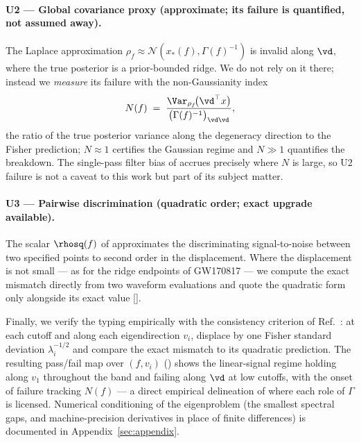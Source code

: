 \paragraph{U2 --- Global covariance proxy (approximate; its failure is
quantified, not assumed away).}
The Laplace approximation
$\rho_f \approx \mathcal{N}(x_{*}(f), \Gamma(f)^{-1})$ is invalid along
$\vd$, where the true posterior is a prior-bounded ridge. We do not
rely on it there; instead we \emph{measure} its failure with the
non-Gaussianity index
\begin{equation}
N(f) \;=\;
\frac{\Var_{\rho_f}\!\bigl(\vd^{\top} x\bigr)}
{\bigl(\Gamma(f)^{-1}\bigr)_{\vd\vd}} ,
\label{eq:ngauss}
\end{equation}
the ratio of the true posterior variance along the degeneracy direction
to the Fisher prediction; $N \approx 1$ certifies the Gaussian regime
and $N \gg 1$ quantifies the breakdown. The single-pass filter bias of
 accrues precisely where $N$ is large, so U2 failure
is not a caveat to this work but part of its subject matter.

\paragraph{U3 --- Pairwise discrimination (quadratic order; exact
upgrade available).}
The scalar $\rhosq(f)$ of  approximates the discriminating
signal-to-noise between two specified points to second order in the
displacement. Where the displacement is not small --- as for the ridge
endpoints of GW170817 --- we compute the exact mismatch directly from
two waveform evaluations and quote the quadratic form only alongside
its exact value [].

Finally, we verify the typing empirically with the consistency
criterion of Ref.~\cite{vallisneri2008fisher}: at each cutoff and along
each eigendirection $v_i$, displace by one Fisher standard deviation
$\lambda_i^{-1/2}$ and compare the exact mismatch to its quadratic
prediction. The resulting pass/fail map over $(f, v_i)$
() shows the linear-signal regime holding along $v_1$
throughout the band and failing along $\vd$ at low cutoffs, with the
onset of failure tracking $N(f)$ --- a direct empirical delineation of
where each role of $\Gamma$ is licensed. Numerical conditioning of the
eigenproblem (the smallest spectral gaps, and machine-precision
derivatives in place of finite differences) is documented in
Appendix~\ref{sec:appendix}.

